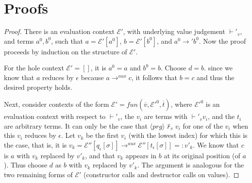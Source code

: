 \chapter{Proofs}

\cdpaux*
\begin{proof}
There is an evaluation context $\mathcal{E}'$, with underlying value judgement $\vdash'_v$, and terms $a^0, b^0$, such that $a = \mathcal{E}'[a^0]$, $b = \mathcal{E}'[b^0]$, and $a^0 \longrightarrow' b^0$. Now the proof proceeds by induction on the structure of $\mathcal{E}'$.

For the hole context $\mathcal{E}' = []$, it is $a^0 = a$ and $b^0 = b$. Choose $d = b$. since we know that $a$ reduces by $\epsilon$ because $a \longrightarrow^{aux} c$, it follows that $b = c$ and thus the desired property holds.

Next, consider contexts of the form $\mathcal{E}' = fun(\overline{v}, \mathcal{E}'^0, \overline{t})$, where $\mathcal{E}'^0$ is an evaluation context with respect to $\vdash'_v$, the $v_i$ are terms with $\vdash'_v v_i$, and the $t_i$ are arbitrary terms. It can only be the case that $\langle prg \rangle \not\vdash_v v_i$ for one of the $v_i$ when this $v_i$ reduces by $\epsilon$. Let $v_k$ be the first $v_i$ (with the lowest index) for which this is the case, that is, it is $v_k = \mathcal{E}''[q_\epsilon[\sigma]] \longrightarrow^{aux} \mathcal{E}''[t_\epsilon[\sigma]] =: v'_k$. We know that $c$ is $a$ with $v_k$ replaced by $v'_k$, and that $v_k$ appears in $b$ at its original position (of $a$). Thus choose $d$ as $b$ with $v_k$ replaced by $v'_k$. The argument is analogous for the two remaining forms of $\mathcal{E}'$ (constructor calls and destructor calls on values).

\end{proof}

